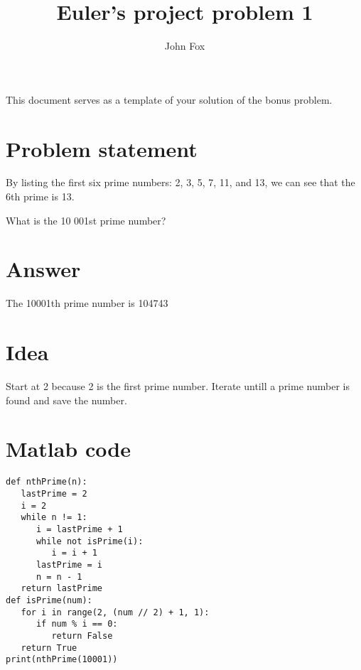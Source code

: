 \documentclass{article}
\title{Euler's project problem 1}
\author{John Fox}
\begin{document}
\maketitle
\large
This document serves as a template of your solution of the bonus problem.\\

\section*{Problem statement} 
By listing the first six prime numbers: 2, 3, 5, 7, 11, and 13, we can see that the 6th prime is 13.

What is the 10 001st prime number?

\section*{Answer}
The 10001th prime number is 104743
\section*{Idea} Start at 2 because 2 is the first prime number. Iterate untill a prime number is found and save the number. 

\section*{Matlab code}
\begin{verbatim}
def nthPrime(n):
   lastPrime = 2
   i = 2
   while n != 1:
      i = lastPrime + 1
      while not isPrime(i):
         i = i + 1
      lastPrime = i
      n = n - 1
   return lastPrime
def isPrime(num):
   for i in range(2, (num // 2) + 1, 1):
      if num % i == 0:
         return False
   return True
print(nthPrime(10001))
\end{verbatim}
\end{document}
